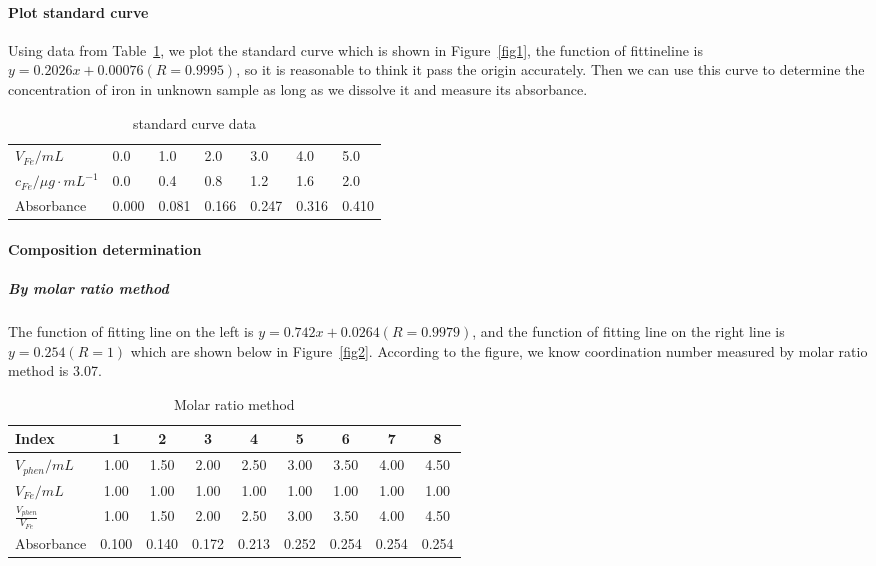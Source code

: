 \paragraph{Plot standard curve}
Using data from Table~\ref{tab.Cal}, we plot the standard curve which is shown in Figure~\ref{fig1}, the function of fittineline is $y=0.2026x+0.00076(R=0.9995)$, so it is reasonable to think it pass the origin accurately. Then we can use this curve to determine the concentration of iron in unknown sample as long as we dissolve it and measure its absorbance.
\begin{table}[H]
    \caption{standard curve data}
    \label{tab.Cal}
    \begin{tabular}{lllllll}
    \toprule
    $V_{Fe}/mL$    & 0.0 & 1.0 & 2.0 & 3.0 & 4.0 & 5.0 \\
    $c_{Fe}/\mu g\cdot mL^{-1}$
                   & 0.0 & 0.4 & 0.8 & 1.2 & 1.6 & 2.0 \\
    \midrule
    Absorbance     &0.000&0.081&0.166&0.247&0.316&0.410\\
    \bottomrule
    \end{tabular}
\end{table}


\paragraph{Composition determination}

\subparagraph{By molar ratio method}

 The function of fitting line on the left is $y=0.742x+0.0264(R=0.9979)$, and the function of fitting line on the right line is $y=0.254(R=1)$ which are shown below in Figure~\ref{fig2}. According to the figure, we know coordination number measured by molar ratio method is 3.07.

\begin{table}[H]
    \caption{Molar ratio method}
    \label{tab.Mrm}
    \begin{tabular}{lcccccccc}
    \toprule
    Index         &  1  &  2  &  3  &  4  &  5  &  6  &  7  &  8  \\
    \midrule
    $V_{phen}/mL$ &1.00 &1.50 &2.00 &2.50 &3.00 &3.50 &4.00 &4.50 \\
    $V_{Fe}/mL$   &1.00 &1.00 &1.00 &1.00 &1.00 &1.00 &1.00 &1.00 \\
    $\frac{V_{phen}}{V_{Fe}}$
                  &1.00 &1.50 &2.00 &2.50 &3.00 &3.50 &4.00 &4.50 \\
    Absorbance    &0.100&0.140&0.172&0.213&0.252&0.254&0.254&0.254\\
    \bottomrule
    \end{tabular}
\end{table}

